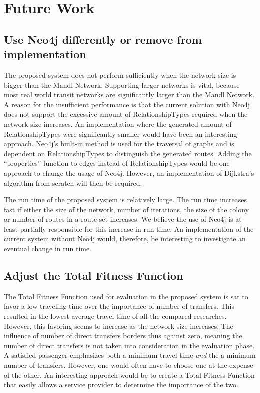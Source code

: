 \section{Future Work}
\label{sec:futureWork}

\subsection*{Use Neo4j differently or remove from implementation}
The proposed system does not perform sufficiently when the network size is bigger than the Mandl Network. Supporting larger networks is vital, because most real world transit networks are significantly larger than the Mandl Network. A reason for the insufficient performance is that the current solution with Neo4j does not support the excessive amount of RelationshipTypes required when the network size increases. An implementation where the generated amount of RelationshipTypes were significantly smaller would have been an interesting approach. Neo4j's built-in method is used for the traversal of graphs and is dependent on RelationshipTypes to distinguish the generated routes. Adding the ``properties'' function to edges instead of RelationshipTypes would be one approach to change the usage of Neo4j. However, an implementation of Dijkstra's algorithm from scratch will then be required.  


The run time of the proposed system is relatively large. The run time increases fast if either the size of the network, number of iterations, the size of the colony or number of routes in a route set increases. We believe the use of Neo4j is at least partially responsible for this increase in run time. An implementation of the current system without Neo4j would, therefore, be interesting to investigate an eventual change in run time.  

\subsection*{Adjust the Total Fitness Function}
The Total Fitness Function used for evaluation in the proposed system is sat to favor a low traveling time over the importance of number of transfers. This resulted in the lowest average travel time of all the compared researches. However, this favoring seems to increase as the network size increases. The influence of number of direct transfers borders thus against zero, meaning the number of direct transfers is not taken into consideration in the evaluation phase. A satisfied passenger emphasizes both a minimum travel time \textit{and} the a minimum number of transfers. However, one would often have to choose one at the expense of the other. An interesting approach would be to create a Total Fitness Function that easily allows a service provider to determine the importance of the two.

